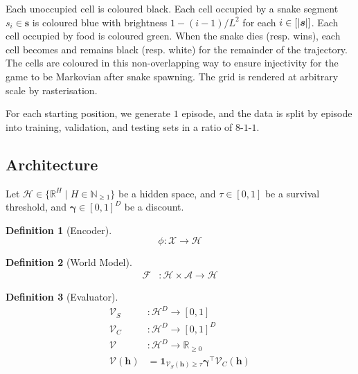\documentclass[10pt, twocolumn]{article}
\theoremstyle{definition}
\newtheorem{definition}{Definition}
\theoremstyle{remark}
\newcommand{\N}{\mathbb{N}}
\newcommand{\R}{\mathbb{R}}
\begin{document}
Each unoccupied cell is coloured black.
Each cell occupied by a snake segment $s_{i}\in\bm{s}$ is coloured blue with brightness $1-(i-1)/L^{2}$
for each $i\in[\abs{\bm{s}}]$.
Each cell occupied by food is coloured green.
When the snake dies (resp. wins), each cell becomes and remains black (resp. white) for the remainder of the trajectory.
The cells are coloured in this non-overlapping way to ensure injectivity for the game to be Markovian after snake spawning.
The grid is rendered at arbitrary scale by rasterisation.

For each starting position, we generate $1$ episode,
and the data is split by episode into training, validation, and testing sets in a ratio of $8$-$1$-$1$.

\subsection{Architecture}

Let $\mathcal{H}\in\{\R^{H}\mid H\in\N_{\geq 1}\}$ be a hidden space,
and $\tau\in[0,1]$ be a survival threshold,
and $\bm{\gamma}\in[0,1]^{D}$ be a discount.

\begin{definition}[Encoder]
$$
	\phi:\mathcal{X}\to\mathcal{H}
$$
\end{definition}

\begin{definition}[World Model]
\begin{align*}
	\mathscr{F}
	&:
	\mathcal{H}\times\mathcal{A}
	\to
	\mathcal{H}
\end{align*}
\end{definition}

\begin{definition}[Evaluator]
\begin{align*}
	\mathscr{V}_{S}
	&:
	\mathcal{H}^{D} %
	\to
	[0,1] %
	\\
	\mathscr{V}_{C}
	&:
	\mathcal{H}^{D} %
	\to
	[0,1]^{D} %
	\\
	\mathscr{V}
	&:
	\mathcal{H}^{D} %
	\to
	\R_{\geq 0}
	\\
	\mathscr{V}(\bm{h})
	&=
	\mathbf{1}_{
		\mathscr{V}_{S}(\bm{h})
		\geq
		\tau
	}
	\bm{\gamma}^{\top}
	\mathscr{V}_{C}(\bm{h})
\end{align*}
\end{definition}
\end{document}
